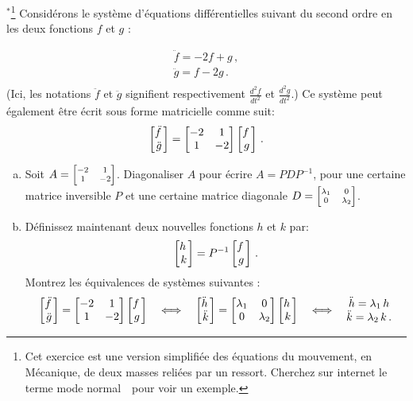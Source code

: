 \begin{prob} \label{prob23.4} $^{\ast}$\footnote{Cet exercice est une version simplifiée des équations du mouvement, en Mécanique, de deux masses reliées par un ressort. Cherchez sur internet le terme \og mode normal\ \fg\ pour voir un exemple. } Considérons le système d'équations différentielles suivant du second ordre en les deux fonctions $f$ et $g$ :

$$\begin{matrix} 
\ddot f=-2 f +g\,,  \\
\ddot g=f-2g\,.\\
 \end{matrix} $$
 (Ici, les notations $\ddot f$ et $\ddot g$ signifient respectivement $\frac{d^2 f}{dt^2}$ et $\frac{d^2 g}{dt^2}$.)
Ce système peut également être écrit sous forme matricielle comme suit: 
$$\bmatrix \ddot f \,\\ \ddot g
 \endbmatrix =\bmatrix -2 & 1 \\
 1 & -2 \endbmatrix \bmatrix  f \,\\   g
 \endbmatrix\,.$$ 

\begin{enumerate}[a)]
	\item Soit $A=\scriptsize\bmatrix -2 & 1 \\
 1 & -2 \endbmatrix $. Diagonaliser $A$ pour écrire $A=PDP^{-1}$, pour une certaine matrice inversible $P$ et une certaine matrice diagonale $D=\scriptsize\bmatrix \lam_1 & 0 \\
 0 & \lam_2 \endbmatrix $. 
 	\item Définissez maintenant deux nouvelles fonctions $h$ et $k$ par:
	$$\bmatrix h \,\\ k
 \endbmatrix = P^{-1} \bmatrix  f \,\\   g
 \endbmatrix\,.$$ 
 Montrez les équivalences de systèmes suivantes :
 $$\bmatrix \ddot f \,\\ \ddot g
 \endbmatrix =\bmatrix -2 & 1 \\
 1 & -2 \endbmatrix \bmatrix  f \,\\   g
 \endbmatrix
        \quad\Longleftrightarrow\quad
 \bmatrix \ddot h\,\\ \ddot k
 \endbmatrix =\bmatrix \lam_1 & 0 \\
 0 & \lam_2 \endbmatrix\bmatrix  h \,\\   k
 \endbmatrix
       \quad\Longleftrightarrow\quad
 \begin{matrix} 
\ddot h=\lam_1 \,h  \\
\ddot k=\lam_2 \,k\,.\\
 \end{matrix} $$ 


\end{enumerate}
\end{prob}
